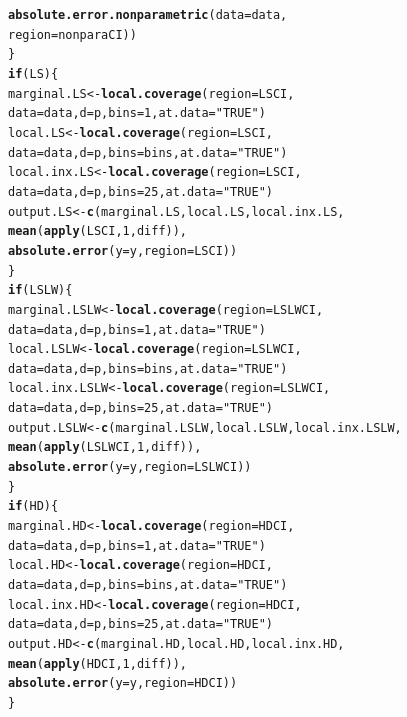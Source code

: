 \documentclass[11pt]{article}\usepackage[]{graphicx}\usepackage[]{color}
\makeatletter
\newcommand{\hlnum}[1]{\textcolor[rgb]{0.686,0.059,0.569}{#1}}%
\newcommand{\hlstr}[1]{\textcolor[rgb]{0.192,0.494,0.8}{#1}}%
\newcommand{\hlstd}[1]{\textcolor[rgb]{0.345,0.345,0.345}{#1}}%
\newcommand{\hlkwa}[1]{\textcolor[rgb]{0.161,0.373,0.58}{\textbf{#1}}}%
\newcommand{\hlkwb}[1]{\textcolor[rgb]{0.69,0.353,0.396}{#1}}%
\newcommand{\hlkwc}[1]{\textcolor[rgb]{0.333,0.667,0.333}{#1}}%
\newcommand{\hlkwd}[1]{\textcolor[rgb]{0.737,0.353,0.396}{\textbf{#1}}}%
\newenvironment{kframe}{%
 \def\at@end@of@kframe{}%
 \ifinner\ifhmode%
  \def\at@end@of@kframe{\end{minipage}}%
  \begin{minipage}{\columnwidth}%
 \fi\fi%
 \def\FrameCommand##1{\hskip\@totalleftmargin \hskip-\fboxsep
 \colorbox{shadecolor}{##1}\hskip-\fboxsep
     \hskip-\linewidth \hskip-\@totalleftmargin \hskip\columnwidth}%
 \MakeFramed {\advance\hsize-\width
   \@totalleftmargin\z@ \linewidth\hsize
   \@setminipage}}%
 {\par\unskip\endMakeFramed%
 \at@end@of@kframe}
\newenvironment{knitrout}{}{} %
\makeatother
\begin{document}
\begin{knitrout}
\begin{kframe}
\begin{alltt}
        \hlkwd{absolute.error.nonparametric}\hlstd{(}\hlkwc{data} \hlstd{= data,}
          \hlkwc{region} \hlstd{= nonparaCI))}
  \hlstd{\}}
  \hlkwa{if}\hlstd{(LS)\{}
    \hlstd{marginal.LS} \hlkwb{<-} \hlkwd{local.coverage}\hlstd{(}\hlkwc{region} \hlstd{= LSCI,}
      \hlkwc{data} \hlstd{= data,} \hlkwc{d} \hlstd{= p,} \hlkwc{bins} \hlstd{=} \hlnum{1}\hlstd{,} \hlkwc{at.data} \hlstd{=} \hlstr{"TRUE"}\hlstd{)}
    \hlstd{local.LS} \hlkwb{<-} \hlkwd{local.coverage}\hlstd{(}\hlkwc{region} \hlstd{= LSCI,}
      \hlkwc{data} \hlstd{= data,} \hlkwc{d} \hlstd{= p,} \hlkwc{bins} \hlstd{= bins,} \hlkwc{at.data} \hlstd{=} \hlstr{"TRUE"}\hlstd{)}
    \hlstd{local.inx.LS} \hlkwb{<-} \hlkwd{local.coverage}\hlstd{(}\hlkwc{region} \hlstd{= LSCI,}
      \hlkwc{data} \hlstd{= data,} \hlkwc{d} \hlstd{= p,} \hlkwc{bins} \hlstd{=} \hlnum{25}\hlstd{,} \hlkwc{at.data} \hlstd{=} \hlstr{"TRUE"}\hlstd{)}
    \hlstd{output.LS} \hlkwb{<-} \hlkwd{c}\hlstd{(marginal.LS, local.LS, local.inx.LS,}
      \hlkwd{mean}\hlstd{(}\hlkwd{apply}\hlstd{(LSCI,} \hlnum{1}\hlstd{, diff)),}
      \hlkwd{absolute.error}\hlstd{(}\hlkwc{y} \hlstd{= y,} \hlkwc{region} \hlstd{= LSCI))}
  \hlstd{\}}
  \hlkwa{if}\hlstd{(LSLW)\{}
    \hlstd{marginal.LSLW} \hlkwb{<-} \hlkwd{local.coverage}\hlstd{(}\hlkwc{region} \hlstd{= LSLWCI,}
      \hlkwc{data} \hlstd{= data,} \hlkwc{d} \hlstd{= p,} \hlkwc{bins} \hlstd{=} \hlnum{1}\hlstd{,} \hlkwc{at.data} \hlstd{=} \hlstr{"TRUE"}\hlstd{)}
    \hlstd{local.LSLW} \hlkwb{<-} \hlkwd{local.coverage}\hlstd{(}\hlkwc{region} \hlstd{= LSLWCI,}
      \hlkwc{data} \hlstd{= data,} \hlkwc{d} \hlstd{= p,} \hlkwc{bins} \hlstd{= bins,} \hlkwc{at.data} \hlstd{=} \hlstr{"TRUE"}\hlstd{)}
    \hlstd{local.inx.LSLW} \hlkwb{<-} \hlkwd{local.coverage}\hlstd{(}\hlkwc{region} \hlstd{= LSLWCI,}
      \hlkwc{data} \hlstd{= data,} \hlkwc{d} \hlstd{= p,} \hlkwc{bins} \hlstd{=} \hlnum{25}\hlstd{,} \hlkwc{at.data} \hlstd{=} \hlstr{"TRUE"}\hlstd{)}
    \hlstd{output.LSLW} \hlkwb{<-} \hlkwd{c}\hlstd{(marginal.LSLW, local.LSLW, local.inx.LSLW,}
      \hlkwd{mean}\hlstd{(}\hlkwd{apply}\hlstd{(LSLWCI,} \hlnum{1}\hlstd{, diff)),}
      \hlkwd{absolute.error}\hlstd{(}\hlkwc{y} \hlstd{= y,} \hlkwc{region} \hlstd{= LSLWCI))}
  \hlstd{\}}
  \hlkwa{if}\hlstd{(HD)\{}
    \hlstd{marginal.HD} \hlkwb{<-} \hlkwd{local.coverage}\hlstd{(}\hlkwc{region} \hlstd{= HDCI,}
      \hlkwc{data} \hlstd{= data,} \hlkwc{d} \hlstd{= p,} \hlkwc{bins} \hlstd{=} \hlnum{1}\hlstd{,} \hlkwc{at.data} \hlstd{=} \hlstr{"TRUE"}\hlstd{)}
    \hlstd{local.HD} \hlkwb{<-} \hlkwd{local.coverage}\hlstd{(}\hlkwc{region} \hlstd{= HDCI,}
      \hlkwc{data} \hlstd{= data,} \hlkwc{d} \hlstd{= p,} \hlkwc{bins} \hlstd{= bins,} \hlkwc{at.data} \hlstd{=} \hlstr{"TRUE"}\hlstd{)}
    \hlstd{local.inx.HD} \hlkwb{<-} \hlkwd{local.coverage}\hlstd{(}\hlkwc{region} \hlstd{= HDCI,}
      \hlkwc{data} \hlstd{= data,} \hlkwc{d} \hlstd{= p,} \hlkwc{bins} \hlstd{=} \hlnum{25}\hlstd{,} \hlkwc{at.data} \hlstd{=} \hlstr{"TRUE"}\hlstd{)}
    \hlstd{output.HD} \hlkwb{<-} \hlkwd{c}\hlstd{(marginal.HD, local.HD, local.inx.HD,}
      \hlkwd{mean}\hlstd{(}\hlkwd{apply}\hlstd{(HDCI,} \hlnum{1}\hlstd{, diff)),}
      \hlkwd{absolute.error}\hlstd{(}\hlkwc{y} \hlstd{= y,} \hlkwc{region} \hlstd{= HDCI))}
  \hlstd{\}}


\end{alltt}
\end{kframe}
\end{knitrout}
\end{document}
